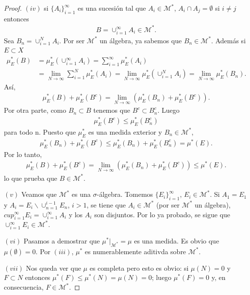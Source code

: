 \begin{proof}
    $(iv)$ si $\{A_i\}_{i=1}^{\infty}$ es una sucesión tal que $A_i \in \mathcal{M}^*$, $A_i \cap A_j = \emptyset$ si $i \not = j$ entonces
    \begin{align*}
        B = \cup_{i=1}^{\infty}{A_i} \in \mathcal{M}^*.
    \end{align*}
    Sea $B_n = \cup_{i=1}^{N}{A_i}$. Por ser $\mathcal{M}^*$ un álgebra, ya sabemos que $B_n \in \mathcal{M}^*$. Además si $E \subset X$
    \begin{align*}
        \mu_E^*(B) & = \mu_E^*(\cup_{i=1}^{\infty}{A_i}) = \sum_{i=1}^{\infty}{\mu_E^*(A_i)}                                                                       \\
                   & = \lim_{N \to \infty}{ \sum_{i=1}^{N}{\mu_E^*(A_i)}} = \lim_{N \to \infty}{\mu_E^*(\cup_{i=1}^{N}{A_i})} = \lim_{N \to \infty}{\mu_E^*(B_n)}.
    \end{align*}
    Así,
    \begin{align*}
        \mu_E^*(B) + \mu_E^*(B^c) = \lim_{N \to \infty}{(\mu_E^*(B_n) + \mu_E^*(B^c))}.
    \end{align*}
    Por otra parte, como $B_n \subset B$ tenemos que $B^c \subset B_n^c$. Luego
    \begin{align*}
        \mu_E^*(B^c) \leq \mu_E^*(B_n^c)
    \end{align*}
    para todo n. Puesto que $\mu_E^*$ es una medida exterior y $B_n \in \mathcal{M}^*$,
    \begin{align*}
        \mu_E^*(B_n) + \mu_E^*(B^c) \leq \mu_E^*(B_n) + \mu_E^*(B_n^c) = \mu^*(E).
    \end{align*}
    Por lo tanto,
    \begin{align*}
        \mu_E^*(B) + \mu_E^*(B^c)  = \lim_{N \to \infty}{(\mu_E^*(B_n) + \mu_E^*(B^c))} \leq \mu^*(E).
    \end{align*}
    lo que prueba que $B \in \mathcal{M}^*$.

    $(v)$ Veamos que $\mathcal{M}^*$ es una $\sigma$-álgebra. Tomemos $\{E_i\}_{i=1}^{\infty}$, $E_i \in \mathcal{M}^*$. Si $A_1 = E_1$ y $A_i = E_i \backslash \cup_{n=1}^{i-1}{E_n}$, $i > 1$, se tiene que $A_i \in \mathcal{M}^*$ (por ser $\mathcal{M}^*$ un álgebra), $cup_{i=1}^{\infty}{E_i} = \cup_{i=1}^{\infty}{A_i}$ y los $A_i$ son disjuntos. Por lo ya probado, se sigue que $\cup_{i=1}^{\infty}{E_i} \in \mathcal{M}^*$.

    $(vi)$ Pasamos a demostrar que $\mu^*|_{\mathcal{M}^*} = \mu$ es una medida. Es obvio que $\mu(\emptyset) = 0$. Por $(iii)$, $\mu^*$ es numerablemente aditivda sobre $\mathcal{M}^*$.

    $(vii)$ Nos queda ver que $\mu$ es completa pero esto es obvio: si $\mu(N) = 0$ y $F \subset N$ entonces $\mu^*(F) \leq \mu^*(N) = \mu(N) = 0$; luego $\mu^*(F) = 0$ y, en consecuencia, $F \in \mathcal{M}^*$.
\end{proof}

